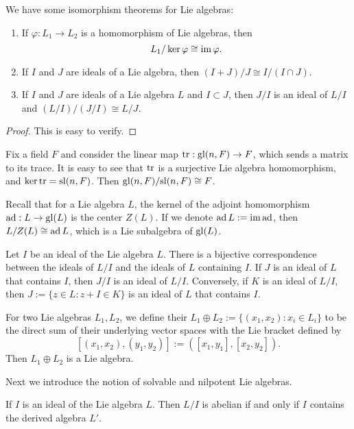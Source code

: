 \begin{thm}
    We have some isomorphism theorems for Lie algebras:
    \begin{enumerate}
        \item If $\varphi:L_1\to L_2$ is a homomorphism of Lie algebras, then 
        \[
            L_1/\ker \varphi\cong \operatorname{im} \varphi.
        \]
        \item If $I$ and $J$ are ideals of a Lie algebra, then $(I+J)/J\cong I/(I\cap J)$.
        \item If $I$ and $J$ are ideals of a Lie algebra $L$ and $I\subset J$, then $J/I$ is an ideal of $L/I$ and $(L/I)/(J/I)\cong L/J$.
    \end{enumerate}
\end{thm}

\begin{proof}
    This is easy to verify.
\end{proof}

\begin{eg}
    Fix a field $F$ and consider the linear map $\operatorname{tr}:\mathrm{gl} (n,F)\to F$, which sends a matrix to its trace. It is easy to see that $\operatorname{tr}$ is a surjective Lie algebra homomorphism, and $\ker\operatorname{tr} =\mathrm{sl}(n,F)$. Then $\mathrm{gl}(n,F)/\mathrm{sl}(n,F)\cong F$.
\end{eg}

\begin{eg}
    Recall that for a Lie algebra $L$, the kernel of the adjoint homomorphism $\operatorname{ad}:L\to \mathrm{gl} (L)$ is the center $Z(L)$. If we denote $\operatorname{ad} L:=\operatorname{im} \operatorname{ad}$, then $L/Z(L)\cong \operatorname{ad} L$, which is a Lie subalgebra of $\mathrm{gl}(L)$.
\end{eg}

Let $I$ be an ideal of the Lie algebra $L$. There is a bijective correspondence between the ideals of $L/I$ and the ideals of $L$ containing $I$. If $J$ is an ideal of $L$ that contains $I$, then $J/I$ is an ideal of $L/I$. Conversely, if $K$ is an ideal of $L/I$, then $J:=\{z\in L:z+I\in K\}$ is an ideal of $L$ that contains $I$.

For two Lie algebras $L_1,L_2$, we define their  $L_1\oplus L_2:=\{(x_1,x_2):x_i\in L_i\}$ to be the direct sum of their underlying vector spaces with the Lie bracket defined by 
\[
    [(x_1,x_2),(y_1,y_2)]:=([x_1,y_1],[x_2,y_2]).
\] 
Then $L_1\oplus L_2$ is a Lie algebra.

Next we introduce the notion of solvable and nilpotent Lie algebras. 

\begin{lem}
    If $I$ is an ideal of the Lie algebra $L$. Then $L/I$ is abelian if and only if $I$ contains the derived algebra $L'$.
\end{lem}

